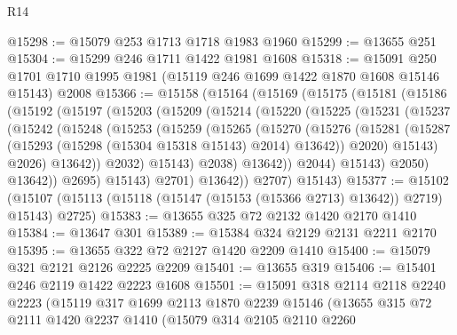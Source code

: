 \begin{lexlean}{R14}
\begin{coremodule}
@15298 := @15079 @253 @1713 @1718 @1983 @1960
@15299 := @13655 @251
@15304 := @15299 @246 @1711 @1422 @1981 @1608
@15318 := @15091
    @250
    @1701
    @1710
    @1995
    @1981
    (@15119 @246 @1699 @1422 @1870 @1608 @15146 @15143)
    @2008
@15366 := @15158
    (@15164
      (@15169
        (@15175
          (@15181
            (@15186
              (@15192
                (@15197
                  (@15203
                    (@15209
                      (@15214
                        (@15220
                          (@15225
                            (@15231
                              (@15237
                                (@15242
                                  (@15248
                                    (@15253
                                      (@15259
                                        (@15265
                                          (@15270
                                            (@15276
                                              (@15281
                                                (@15287
                                                  (@15293
                                                    (@15298 (@15304 @15318 @15143) @2014)
                                                    @13642))
                                                @2020)
                                              @15143)
                                            @2026)
                                          @13642))
                                      @2032)
                                    @15143)
                                  @2038)
                                @13642))
                            @2044)
                          @15143)
                        @2050)
                      @13642))
                  @2695)
                @15143)
              @2701)
            @13642))
        @2707)
      @15143)
@15377 := @15102
    (@15107 (@15113 (@15118 (@15147 (@15153 (@15366 @2713) @13642)) @2719) @15143) @2725)
@15383 := @13655 @325 @72 @2132 @1420 @2170 @1410
@15384 := @13647 @301
@15389 := @15384 @324 @2129 @2131 @2211 @2170
@15395 := @13655 @322 @72 @2127 @1420 @2209 @1410
@15400 := @15079 @321 @2121 @2126 @2225 @2209
@15401 := @13655 @319
@15406 := @15401 @246 @2119 @1422 @2223 @1608
@15501 := @15091
    @318
    @2114
    @2118
    @2240
    @2223
    (@15119
      @317
      @1699
      @2113
      @1870
      @2239
      @15146
      (@13655
        @315
        @72
        @2111
        @1420
        @2237
        @1410
        (@15079
          @314
          @2105
          @2110
          @2260

\end{coremodule}
\end{lexlean}
